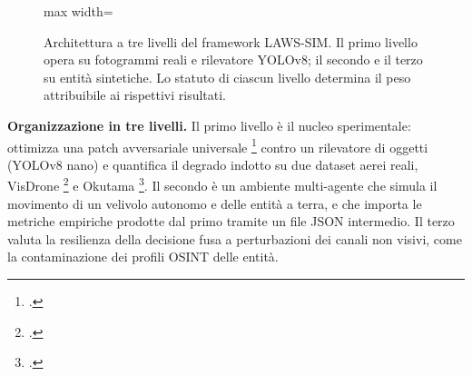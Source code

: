 \documentclass[a4paper,12pt]{report}
\begin{document}
\begin{figure}[htbp]
\centering
\begin{adjustbox}{max width=\textwidth}
\end{adjustbox}
\caption[Architettura a tre livelli del framework LAWS-SIM]{Architettura a
tre livelli del framework LAWS-SIM. Il primo livello opera su fotogrammi reali e
rilevatore YOLOv8; il secondo e il terzo su entità sintetiche. Lo statuto di
ciascun livello determina il peso attribuibile ai rispettivi risultati.}
\label{fig:tre_livelli}
\end{figure}

\textbf{Organizzazione in tre livelli.}
\label{sec:tre_layer}
Il primo livello è il nucleo sperimentale: ottimizza una patch avversariale
universale \footcite{brown_2017_patch,thys_2019} contro un rilevatore di oggetti
(YOLOv8 nano) e quantifica il degrado indotto su due dataset aerei reali,
VisDrone \footcite{zhu_2021_visdrone} e Okutama
\footcite{barekatain_2017_okutama}. Il secondo è un ambiente multi-agente che
simula il movimento di un velivolo autonomo e delle entità a terra, e che
importa le metriche empiriche prodotte dal primo tramite un file JSON
intermedio. Il terzo valuta la resilienza della decisione fusa a perturbazioni
dei canali non visivi, come la contaminazione dei profili OSINT delle entità.
\end{document}

